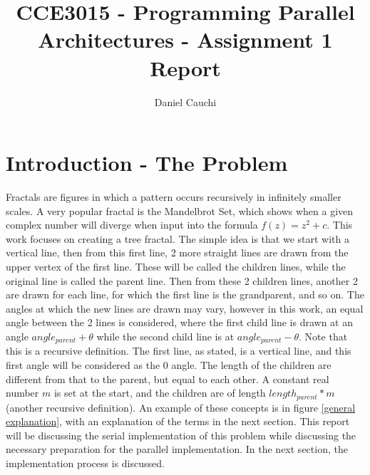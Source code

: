 \documentclass[11pt]{article}
\begin{document}
\title{CCE3015 - Programming Parallel Architectures - Assignment 1 Report}
\author{Daniel Cauchi}
\date{}
\maketitle

\section{Introduction - The Problem} \label{intro}
Fractals are figures in which a pattern occurs recursively in infinitely smaller scales. A very popular fractal is the Mandelbrot Set, which shows when a given complex number will diverge when input into the formula $f(z) = z^2 + c$. This work focuses on creating a tree fractal. The simple idea is that we start with a vertical line, then from this first line, 2 more straight lines are drawn from the upper vertex of the first line. These will be called the children lines, while the original line is called the parent line. Then from these 2 children lines, another 2 are drawn for each line, for which the first line is the grandparent, and so on. The angles at which the new lines are drawn may vary, however in this work, an equal angle between the 2 lines is considered, where the first child line is drawn at an angle $angle_{parent} + \theta$ while the second child line is at $angle_{parent} - \theta$. Note that this is a recursive definition. The first line, as stated, is a vertical line, and this first angle will be considered as the 0 angle. The length of the children are different from that to the parent, but equal to each other. A constant real number $m$ is set at the start, and the children are of length $length_{parent} * m$ (another recursive definition). An example of these concepts is in figure \ref{general explanation}, with an explanation of the terms in the next section. This report will be discussing the serial implementation of this problem while discussing the necessary preparation for the parallel implementation. In the next section, the implementation process is discussed.
\end{document}
